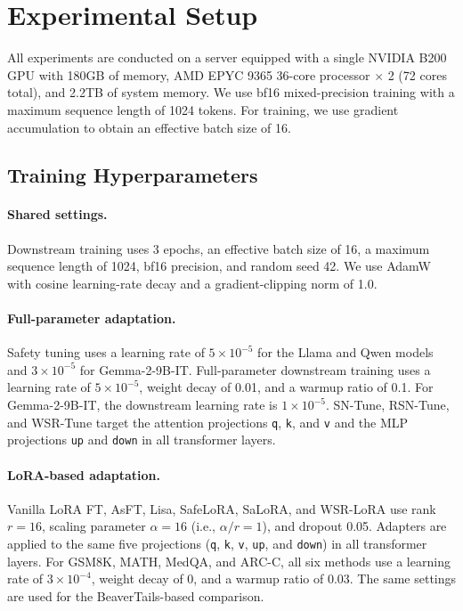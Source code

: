 \documentclass{article}
\begin{document}
\section{Experimental Setup}
\label{app:experimental_setup}

All experiments are conducted on a server equipped with a single NVIDIA B200 GPU with 180GB of memory, AMD EPYC 9365 36-core processor $\times$ 2 (72 cores total), and 2.2TB of system memory. We use bf16 mixed-precision training with a maximum sequence length of 1024 tokens. For training, we use gradient accumulation to obtain an effective batch size of 16.


\subsection{Training Hyperparameters}
\label{app:hyperparameters}

\paragraph{Shared settings.}
Downstream training uses 3 epochs, an effective batch size of 16, a maximum sequence length of 1024, bf16 precision, and random seed 42. We use AdamW with cosine learning-rate decay and a gradient-clipping norm of 1.0. 

\paragraph{Full-parameter adaptation.}
Safety tuning uses a learning rate of $5\times10^{-5}$ for the Llama and Qwen models and $3\times10^{-5}$ for Gemma-2-9B-IT. Full-parameter downstream training uses a learning rate of $5\times10^{-5}$, weight decay of 0.01, and a warmup ratio of 0.1. For Gemma-2-9B-IT, the downstream learning rate is $1\times10^{-5}$. SN-Tune, RSN-Tune, and WSR-Tune target the attention projections \texttt{q}, \texttt{k}, and \texttt{v} and the MLP projections \texttt{up} and \texttt{down} in all transformer layers.

\paragraph{LoRA-based adaptation.}
Vanilla LoRA FT, AsFT, Lisa, SafeLoRA, SaLoRA, and WSR-LoRA use rank $r=16$, scaling parameter $\alpha=16$ (i.e., $\alpha/r=1$), and dropout 0.05. Adapters are applied to the same five projections (\texttt{q}, \texttt{k}, \texttt{v}, \texttt{up}, and \texttt{down}) in all transformer layers. For GSM8K, MATH, MedQA, and ARC-C, all six methods use a learning rate of $3\times10^{-4}$, weight decay of 0, and a warmup ratio of 0.03. The same settings are used for the BeaverTails-based comparison.
\end{document}
